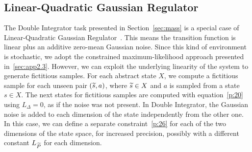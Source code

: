 \subsection{Linear-Quadratic Gaussian Regulator}\label{subsec:app2.4}
The Double Integrator task presented in Section~\ref{sec:mass} is a special case of Linear-Quadratic Gaussian Regulator~\citep[LQG,]{peters2002policy}. This means the transition function is linear plus an additive zero-mean Gaussian noise.
Since this kind of environment is stochastic, we adopt the constrained maximum-likelihood approach presented in~\ref{sec:app2.3}. 
However, we can exploit the underlying linearity of the system to generate fictitious samples.
For each abstract state $X$, we compute a fictitious sample for each unseen pair $(\widetilde{s}, a)$, where $\widetilde{s} \in X$ and $a$ is sampled from a state $s \in X$. The next states for fictitious samples are computed with equation~\eqref{p:20} using $L_{\Delta}=0$, as if the noise was not present. 
In Double Integrator, the Gaussian noise is added to each dimension of the state independently from the other one. 
In this case, we can define a separate constraint~\eqref{p:26} for each of the two dimensions of the state space, for increased precision, possibly with a different constant $L_{\widetilde{P}}$ for each dimension.